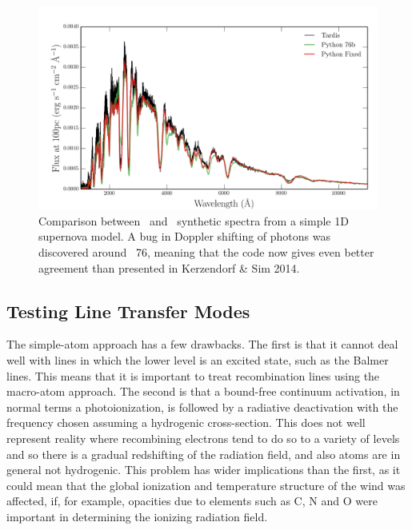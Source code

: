 \begin{figure}
\centering
\includegraphics[width=1.0\textwidth]{figures/03-radtrans/tardispython_thesis.png}
\caption[Comparison between \tar\ and \py\ synthetic spectra from 
a simple 1D supernova model.]
{
Comparison between \tar\ and \py\ synthetic spectra from 
a simple 1D supernova model. A bug in Doppler shifting of
photons was discovered around \py\ 76, meaning that the code now gives
even better agreement than presented in Kerzendorf \& Sim 2014.
}
\label{fig:tardis_spec}
\end{figure}

\subsection{Testing Line Transfer Modes}
\label{sec:line_test}
The simple-atom approach has a few drawbacks. The first is that it cannot
deal well with lines in which the lower level is an excited state, such as the 
Balmer lines. This means that it is important to treat recombination lines using the 
macro-atom approach. The second is that a bound-free continuum activation, 
in normal terms a photoionization, is followed by a radiative deactivation
with the frequency chosen assuming a hydrogenic cross-section. 
This does not well represent reality where recombining
electrons tend to do so to a variety of levels and so there is a gradual
redshifting of the radiation field, and also atoms are in general not hydrogenic. 
This problem has wider implications than
the first, as it could mean that the global ionization and temperature structure of the wind
was affected, if, for example, opacities due to elements such as C, N and O were important
in determining the ionizing radiation field.


